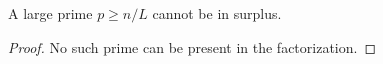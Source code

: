 \begin{sublemma}
\label{initial-factorization-large-prime-le}
\leanok
A large prime $p \geq n/L$ cannot be in surplus.
\end{sublemma}
\begin{proof}
\leanok
No such prime can be present in the factorization.
\end{proof}
